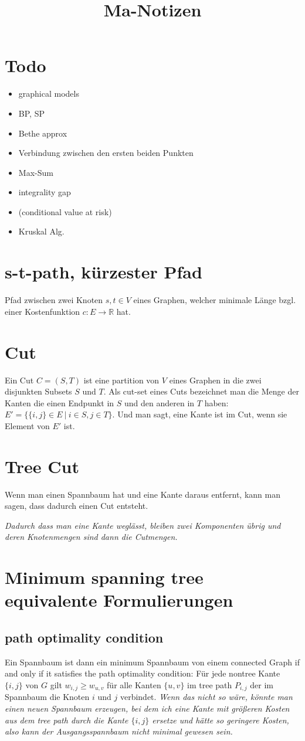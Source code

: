 \documentclass[paper=a4,10pt]{scrartcl}
\begin{document}
\title{Ma-Notizen}

\section{Todo}
\begin{itemize}
\item graphical models
\item BP, SP
\item Bethe approx
\item Verbindung zwischen den ersten beiden Punkten
\item Max-Sum
\item integrality gap
\item (conditional value at risk)
\item Kruskal Alg.
\end{itemize}

\section{s-t-path, kürzester Pfad}
Pfad zwischen zwei Knoten $s, t\in V$ eines Graphen, welcher minimale Länge bzgl. einer Kostenfunktion $c: E \rightarrow \mathbb{R}$ hat.

\section{Cut}
Ein Cut $C=(S,T)$ ist eine partition von $V$ eines Graphen in die zwei disjunkten Subsets $S$ und $T$.
Als cut-set eines Cuts bezeichnet man die Menge der Kanten die einen Endpunkt in $S$ und den anderen in $T$ haben: $E' = \{ \{i,j\} \in E \ | \ i \in S, j \in T\}$. Und man sagt, eine Kante ist im Cut, wenn sie Element von $E'$ ist.

\section{Tree Cut}
Wenn man einen Spannbaum hat und eine Kante daraus entfernt, kann man sagen, dass dadurch einen Cut entsteht.

\textit{Dadurch dass man eine Kante weglässt, bleiben zwei Komponenten übrig und deren Knotenmengen sind dann die Cutmengen.} 

\section{Minimum spanning tree equivalente Formulierungen}
\subsection{path optimality condition}
Ein Spannbaum ist dann ein minimum Spannbaum von einem connected Graph if and only if it satisfies the path optimality condition:
Für jede nontree Kante $\{i, j\}$ von $G$ gilt $w_{i,j} \ge w_{u,v}$ für alle Kanten $\{u, v\}$ im tree path $P_{i,j}$ der im Spannbaum die Knoten $i$ und $j$ verbindet.
\textit{Wenn das nicht so wäre, könnte man einen neuen Spannbaum erzeugen, bei dem ich eine Kante mit größeren Kosten aus dem tree path durch die Kante $\{i,j\}$ ersetze und hätte so geringere Kosten, also kann der Ausgangsspannbaum nicht minimal gewesen sein.}
\end{document}
